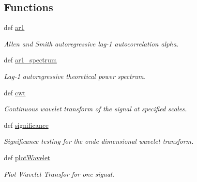 \subsection*{Functions}
\begin{DoxyCompactItemize}
\item 
def \hyperlink{namespaceprojects_1_1piwavelet_1_1piwavelet_1_1piwavelet_a5b23242069fa8c430a2b96bfa14faaa2}{ar1}
\begin{DoxyCompactList}\small\item\em Allen and Smith autoregressive lag-\/1 autocorrelation alpha. \end{DoxyCompactList}\item 
def \hyperlink{namespaceprojects_1_1piwavelet_1_1piwavelet_1_1piwavelet_a64cbd2681659c7666f1a7086ea085406}{ar1\-\_\-spectrum}
\begin{DoxyCompactList}\small\item\em Lag-\/1 autoregressive theoretical power spectrum. \end{DoxyCompactList}\item 
def \hyperlink{namespaceprojects_1_1piwavelet_1_1piwavelet_1_1piwavelet_abe9c6ffc351e734eda9303af63de2c22}{cwt}
\begin{DoxyCompactList}\small\item\em Continuous wavelet transform of the signal at specified scales. \end{DoxyCompactList}\item 
def \hyperlink{namespaceprojects_1_1piwavelet_1_1piwavelet_1_1piwavelet_a2f562484c18165343361bc1340ed3e92}{significance}
\begin{DoxyCompactList}\small\item\em Significance testing for the onde dimensional wavelet transform. \end{DoxyCompactList}\item 
def \hyperlink{namespaceprojects_1_1piwavelet_1_1piwavelet_1_1piwavelet_a000735dcdf58977f8d5be20f17be3ec1}{plot\-Wavelet}
\begin{DoxyCompactList}\small\item\em Plot Wavelet Transfor for one signal. \end{DoxyCompactList}\end{DoxyCompactItemize}
